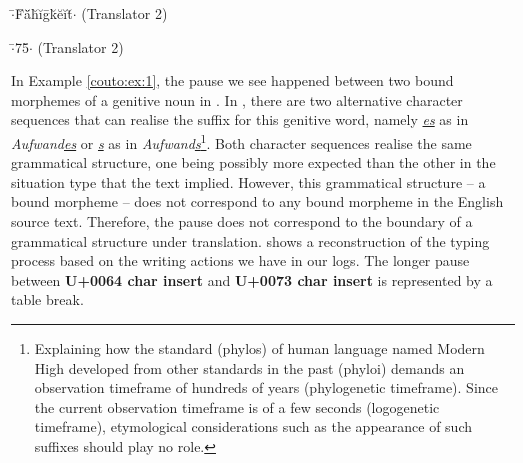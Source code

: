 \documentclass[output=paper]{LSP/langsci}
\begin{document}
\begin{exe}%
  \ex\label{couto:ex:2}$\cdot$\={ }F\u{ }ä\u{ }h\u{ }i\u{ }g\={ }k\u{ }e\u{ }i\u{ }t\u{ }$\cdot$ (Translator 2)
\end{exe}

\begin{exe}%
  \ex\label{couto:ex:3}$\cdot$\={ }7\={ }5\={ }$\cdot$ (Translator 2)
\end{exe}


In Example \ref{couto:ex:1}, the pause we see happened between two bound morphemes of a genitive noun in . In , there are two alternative character sequences that can realise the suffix for this genitive word, namely \emph{\uline{es}} as in \emph{Aufwand\uline{es}} or \emph{\uline{s}} as in \emph{Aufwand\uline{s}}\footnote{Explaining how the standard (phylos) of human language named Modern High  developed from other standards in the past (phyloi) demands an observation timeframe of hundreds of years (phylogenetic timeframe). Since the current observation timeframe is of a few seconds (logogenetic timeframe), etymological considerations such as the appearance of such suffixes should play no role.}. Both character sequences realise the same grammatical structure, one being possibly more expected than the other in the situation type that the text implied. However, this grammatical structure -- a bound morpheme -- does not correspond to any bound morpheme in the English source text. Therefore, the pause does not correspond to the boundary of a grammatical structure under translation.  shows a reconstruction of the typing process based on the writing actions we have in our logs. The longer pause between \textbf{U+0064 char insert} and \textbf{U+0073 char insert} is represented by a table break.
\end{document}
